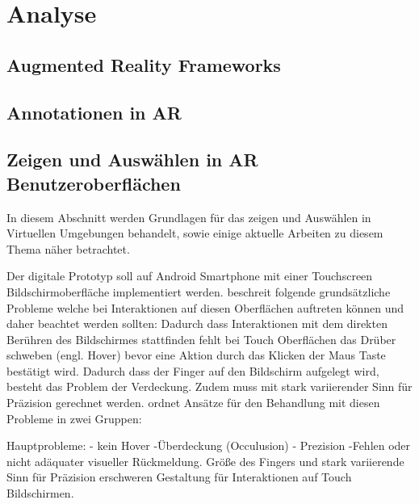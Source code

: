 \chapter{Analyse}

\section{Augmented Reality Frameworks}






\section{Annotationen in AR}

\cite{Brandenburg2019}

\section{Zeigen und Auswählen in AR Benutzeroberflächen}

In diesem Abschnitt werden Grundlagen für das zeigen und Auswählen in Virtuellen Umgebungen behandelt, sowie einige aktuelle Arbeiten 
zu diesem Thema näher betrachtet. 

Der digitale Prototyp soll auf Android Smartphone mit einer Touchscreen Bildschirmoberfläche implementiert werden.
\cite[S.~205]{Ortega2016} beschreit folgende grundsätzliche Probleme welche bei Interaktionen auf diesen Oberflächen auftreten können und daher beachtet werden sollten:  
Dadurch dass Interaktionen mit dem direkten Berühren des Bildschirmes stattfinden fehlt bei Touch Oberflächen das Drüber schweben (engl. Hover) bevor eine Aktion durch das Klicken der Maus Taste bestätigt wird. 
Dadurch dass der Finger auf den Bildschirm aufgelegt wird, besteht das Problem der Verdeckung. Zudem muss mit stark variierender Sinn für Präzision gerechnet werden. \cite[S.~205]{Ortega2016} ordnet Ansätze 
für den Behandlung mit diesen Probleme in zwei Gruppen: 


Hauptprobleme: - kein Hover -Überdeckung (Occulusion) - Prezision -Fehlen oder nicht adäquater visueller Rückmeldung. 
Größe des Fingers und stark variierende Sinn für Präzision erschweren Gestaltung für Interaktionen auf Touch Bildschirmen.

